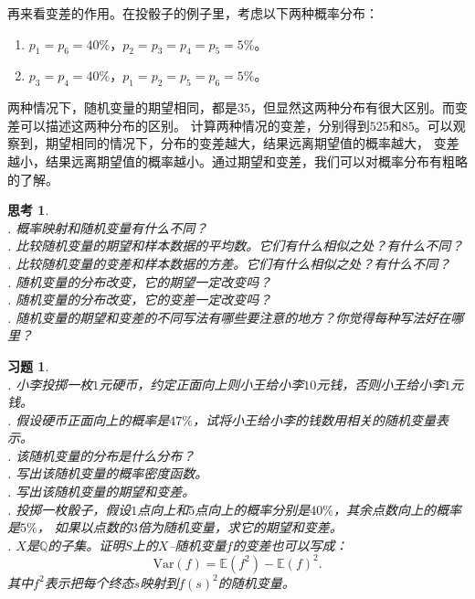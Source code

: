 \documentclass[12pt,UTF8]{ctexbook}
\newtheorem{sk}{思考}[section]
\newtheorem{xt}{习题}[section]
\begin{document}
再来看变差的作用。在投骰子的例子里，考虑以下两种概率分布：
\begin{enumerate}
    \item $p_1 = p_6 = 40\%$，$p_2 = p_3 = p_4 = p_5 = 5\%$。
    \item $p_3 = p_4 = 40\%$，$p_1 = p_2 = p_5 = p_6 = 5\%$。
\end{enumerate}
两种情况下，随机变量的期望相同，都是$35$，但显然这两种分布有很大区别。而变差可以描述这两种分布的区别。
计算两种情况的变差，分别得到$525$和$85$。可以观察到，期望相同的情况下，分布的变差越大，结果远离期望值的概率越大，
变差越小，结果远离期望值的概率越小。通过期望和变差，我们可以对概率分布有粗略的了解。

\begin{sk}
    \mbox{} \\
    . 概率映射和随机变量有什么不同？ \\
    . 比较随机变量的期望和样本数据的平均数。它们有什么相似之处？有什么不同？\\
    . 比较随机变量的变差和样本数据的方差。它们有什么相似之处？有什么不同？\\
    . 随机变量的分布改变，它的期望一定改变吗？\\
    . 随机变量的分布改变，它的变差一定改变吗？ \\
    . 随机变量的期望和变差的不同写法有哪些要注意的地方？你觉得每种写法好在哪里？   
\end{sk}

\begin{xt}
    \mbox{} \\
    . 小李投掷一枚$1$元硬币，约定正面向上则小王给小李$10$元钱，否则小王给小李$1$元钱。\\
    . 假设硬币正面向上的概率是$47\%$，试将小王给小李的钱数用相关的随机变量表示。\\
    . 该随机变量的分布是什么分布？    \\
    . 写出该随机变量的概率密度函数。\\
    . 写出该随机变量的期望和变差。\\
    . 投掷一枚骰子，假设$1$点向上和$5$点向上的概率分别是$40\%$，其余点数向上的概率是$5\%$，
    如果以点数的$3$倍为随机变量，求它的期望和变差。\\
    . $X$是$\mathbb{Q}$的子集。证明$S$上的$X$–随机变量$f$的变差也可以写成：
    $$ \mathrm{Var}(f)  = \mathbb{E}(f^2) - \mathbb{E}(f)^2.$$  
    \indent \hspace{1em}  其中$f^2$表示把每个终态$s$映射到$f(s)^2$的随机变量。
\end{xt}
\end{document}
